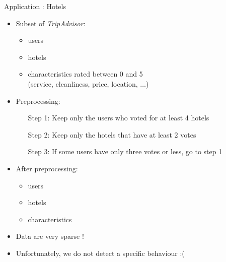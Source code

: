 \begin{frame}{Application : Hotels}
\begin{itemize}
    \item Subset of \textit{TripAdvisor}:
    \begin{itemize}
        \item {} users
        \item {} hotels
        \item {} characteristics rated between 0 and 5\\ (service, cleanliness, price, location, $\dots$)
    \end{itemize}
    \item Preprocessing:
    \begin{itemize}
        \item[Step 1:] Keep only the users who voted for at least 4 hotels
        \item[Step 2:] Keep only the hotels that have at least 2 votes
        \item[Step 3:] If some users have only three votes or less, go to step 1
    \end{itemize}
    \item After preprocessing:
    \begin{itemize}
        \item {} users
        \item {} hotels
        \item {} characteristics
    \end{itemize}
    \item Data are very sparse !
    \item Unfortunately, we do not detect a specific behaviour :(
\end{itemize}
\end{frame}

